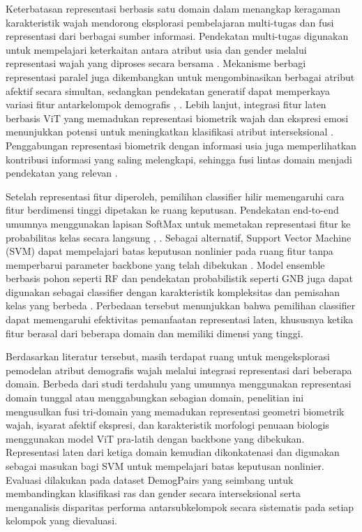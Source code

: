 Keterbatasan representasi berbasis satu domain dalam menangkap keragaman karakteristik wajah mendorong eksplorasi pembelajaran multi-tugas dan fusi representasi dari berbagai sumber informasi. Pendekatan multi-tugas digunakan untuk mempelajari keterkaitan antara atribut usia dan gender melalui representasi wajah yang diproses secara bersama \cite{ref12}. Mekanisme berbagi representasi paralel juga dikembangkan untuk mengombinasikan berbagai atribut afektif secara simultan, sedangkan pendekatan generatif dapat memperkaya variasi fitur antarkelompok demografis \cite{ref16}, \cite{ref15}. Lebih lanjut, integrasi fitur laten berbasis ViT yang memadukan representasi biometrik wajah dan ekspresi emosi menunjukkan potensi untuk meningkatkan klasifikasi atribut interseksional \cite{ref19}. Penggabungan representasi biometrik dengan informasi usia juga memperlihatkan kontribusi informasi yang saling melengkapi, sehingga fusi lintas domain menjadi pendekatan yang relevan \cite{ref20}.

Setelah representasi fitur diperoleh, pemilihan classifier hilir memengaruhi cara fitur berdimensi tinggi dipetakan ke ruang keputusan. Pendekatan end-to-end umumnya menggunakan lapisan SoftMax untuk memetakan representasi fitur ke probabilitas kelas secara langsung \cite{ref11}, \cite{ref18}. Sebagai alternatif, Support Vector Machine (SVM) dapat mempelajari batas keputusan nonlinier pada ruang fitur tanpa memperbarui parameter backbone yang telah dibekukan \cite{ref13}. Model ensemble berbasis pohon seperti RF dan pendekatan probabilistik seperti GNB juga dapat digunakan sebagai classifier dengan karakteristik kompleksitas dan pemisahan kelas yang berbeda \cite{ref12}. Perbedaan tersebut menunjukkan bahwa pemilihan classifier dapat memengaruhi efektivitas pemanfaatan representasi laten, khususnya ketika fitur berasal dari beberapa domain dan memiliki dimensi yang tinggi.

Berdasarkan literatur tersebut, masih terdapat ruang untuk mengeksplorasi pemodelan atribut demografis wajah melalui integrasi representasi dari beberapa domain. Berbeda dari studi terdahulu yang umumnya menggunakan representasi domain tunggal atau menggabungkan sebagian domain, penelitian ini mengusulkan fusi tri-domain yang memadukan representasi geometri biometrik wajah, isyarat afektif ekspresi, dan karakteristik morfologi penuaan biologis menggunakan model ViT pra-latih dengan backbone yang dibekukan. Representasi laten dari ketiga domain kemudian dikonkatenasi dan digunakan sebagai masukan bagi SVM untuk mempelajari batas keputusan nonlinier. Evaluasi dilakukan pada dataset DemogPairs yang seimbang untuk membandingkan klasifikasi ras dan gender secara interseksional serta menganalisis disparitas performa antarsubkelompok secara sistematis pada setiap kelompok yang dievaluasi.
